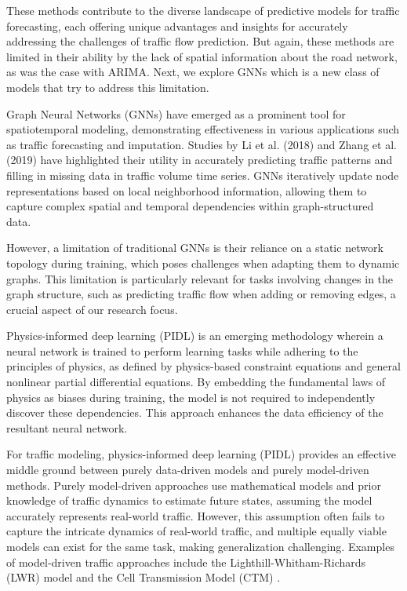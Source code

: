 These methods contribute to the diverse landscape of predictive models for traffic forecasting, each offering unique advantages and insights for accurately addressing the challenges of traffic flow prediction. But again, these methods are limited in their ability by the lack of spatial information about the road network, as was the case with ARIMA.
Next, we explore GNNs which is a new class of models that try to address this limitation.

Graph Neural Networks (GNNs) \cite{gnn} have emerged as a prominent tool for spatiotemporal modeling, demonstrating effectiveness in various applications such as traffic forecasting and imputation. Studies by Li et al. (2018) \cite{li2018gnn} and Zhang et al. (2019) \cite{wavenet} have highlighted their utility in accurately predicting traffic patterns and filling in missing data in traffic volume time series. GNNs iteratively update node representations based on local neighborhood information, allowing them to capture complex spatial and temporal dependencies within graph-structured data. 

However, a limitation of traditional GNNs is their reliance on a static network topology during training, which poses challenges when adapting them to dynamic graphs. This limitation is particularly relevant for tasks involving changes in the graph structure, such as predicting traffic flow when adding or removing edges, a crucial aspect of our research focus.

Physics-informed deep learning (PIDL) \cite{raissi2017physics} is an emerging methodology wherein a neural network is trained to perform learning tasks while adhering to the principles of physics, as defined by physics-based constraint equations and general nonlinear partial differential equations. By embedding the fundamental laws of physics as biases during training, the model is not required to independently discover these dependencies. This approach enhances the data efficiency of the resultant neural network.

For traffic modeling, physics-informed deep learning (PIDL) provides an effective middle ground between purely data-driven models and purely model-driven methods. Purely model-driven approaches use mathematical models and prior knowledge of traffic dynamics to estimate future states, assuming the model accurately represents real-world traffic. However, this assumption often fails to capture the intricate dynamics of real-world traffic, and multiple equally viable models can exist for the same task, making generalization challenging. Examples of model-driven traffic approaches include the Lighthill-Whitham-Richards (LWR) \cite{lwr} model and the Cell Transmission Model (CTM) \cite{ctm}. 

